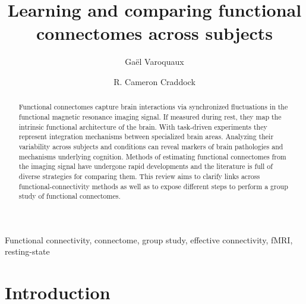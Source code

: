 \documentclass[5p]{elsarticle}
\begin{document}


\title{Learning and comparing functional connectomes across subjects}


\author[parietal,unicog,cea]{Ga\"el Varoquaux}
\author[cmi,nki]{R. Cameron Craddock}


\address[parietal]{Parietal project-team, INRIA Saclay-\^ile de France}
\address[unicog]{INSERM, U992}
\address[cea]{CEA/Neurospin b\^at 145, 91191 Gif-Sur-Yvette}
\address[cmi]{Child Mind Institute, New York, New York}
\address[nki]{Nathan Kline Institute for Psychiatric Research, Orangeburg, New York}

\begin{abstract}
	Functional connectomes capture brain interactions via synchronized
	fluctuations in the functional magnetic resonance imaging signal. If
	measured during rest, they map the intrinsic functional architecture of
	the brain. With task-driven experiments they represent integration
	mechanisms between specialized brain areas. Analyzing their variability
	across subjects and conditions can reveal
	markers of brain pathologies and mechanisms underlying cognition.
	Methods of estimating functional connectomes from the imaging signal
	have undergone rapid developments and the literature is full of diverse
	strategies for comparing them. This review aims to clarify links across
	functional-connectivity methods as well as to expose different steps 
	to perform a group study of functional connectomes.
\end{abstract}

\begin{keyword}
    Functional connectivity, connectome, group study, effective
    connectivity, fMRI, resting-state
\end{keyword}

\maketitle

\sloppy %

\section{Introduction}
\end{document}
